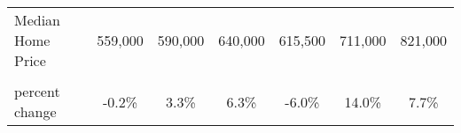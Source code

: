 \begin{table}
\begin{tabular}{lcccccc}
\addlinespace
Median Home Price & 559,000 & 590,000 & 640,000 & 615,500 & 711,000 & 821,000\\
\cellcolor{gray!6}{Median Home Price (\$2009)} & \cellcolor{gray!6}{500,736} & \cellcolor{gray!6}{517,482} & \cellcolor{gray!6}{550,317} & \cellcolor{gray!6}{517,281} & \cellcolor{gray!6}{589,745} & \cellcolor{gray!6}{635,280}\\
percent change & -0.2\% & 3.3\% & 6.3\% & -6.0\% & 14.0\% & 7.7\%\\
\bottomrule
\end{tabular}
\end{table}
